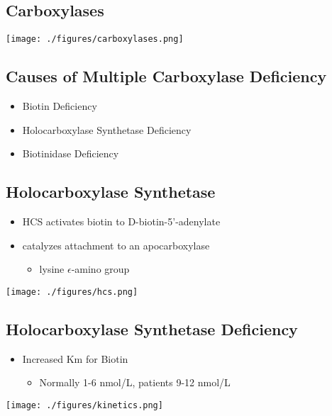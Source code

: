 \documentclass[presentation, smaller]{beamer}
\begin{document}
\subsection{Carboxylases}
\label{sec:orgheadline2}


\texttt{[image: ./figures/carboxylases.png]}

\subsection{Causes of Multiple Carboxylase Deficiency}
\label{sec:orgheadline3}
\begin{itemize}
\item Biotin Deficiency
\item Holocarboxylase Synthetase Deficiency
\item Biotinidase Deficiency
\end{itemize}

\subsection{Holocarboxylase Synthetase}
\label{sec:orgheadline4}
\begin{itemize}
\item HCS activates biotin to D-biotin-5'-adenylate
\item catalyzes attachment to an apocarboxylase
\begin{itemize}
\item lysine \(\epsilon\)-amino group
\end{itemize}
\end{itemize}

\texttt{[image: ./figures/hcs.png]}

\subsection{Holocarboxylase Synthetase Deficiency}
\label{sec:orgheadline5}
\begin{itemize}
\item Increased Km for Biotin
\begin{itemize}
\item Normally 1-6 nmol/L, patients 9-12 nmol/L
\end{itemize}
\end{itemize}

\begin{center}
\texttt{[image: ./figures/kinetics.png]}
\end{center}
\end{document}
